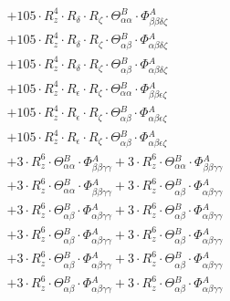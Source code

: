 \documentclass{article}
\begin{document}
\begin{subequations}
\begin{gather}
\begin{array}{c}
 \\[0.2em] 		 + 105 \cdot R_{z}^{4} \cdot R_{\delta{}} \cdot R_{\zeta{}} \cdot \Theta{}^{B}_{\alpha{}\alpha{}} \cdot \Phi{}^{A}_{\beta{}\beta{}\delta{}\zeta{}} 
 \\[0.2em] 		 + 105 \cdot R_{z}^{4} \cdot R_{\delta{}} \cdot R_{\zeta{}} \cdot \Theta{}^{B}_{\alpha{}\beta{}} \cdot \Phi{}^{A}_{\alpha{}\beta{}\delta{}\zeta{}} 
 \\[0.2em] 		 + 105 \cdot R_{z}^{4} \cdot R_{\delta{}} \cdot R_{\zeta{}} \cdot \Theta{}^{B}_{\alpha{}\beta{}} \cdot \Phi{}^{A}_{\alpha{}\beta{}\delta{}\zeta{}} 
 \\[0.2em] 		 + 105 \cdot R_{z}^{4} \cdot R_{\epsilon{}} \cdot R_{\zeta{}} \cdot \Theta{}^{B}_{\alpha{}\alpha{}} \cdot \Phi{}^{A}_{\beta{}\beta{}\epsilon{}\zeta{}} 
 \\[0.2em] 		 + 105 \cdot R_{z}^{4} \cdot R_{\epsilon{}} \cdot R_{\zeta{}} \cdot \Theta{}^{B}_{\alpha{}\beta{}} \cdot \Phi{}^{A}_{\alpha{}\beta{}\epsilon{}\zeta{}} 
 \\[0.2em] 		 + 105 \cdot R_{z}^{4} \cdot R_{\epsilon{}} \cdot R_{\zeta{}} \cdot \Theta{}^{B}_{\alpha{}\beta{}} \cdot \Phi{}^{A}_{\alpha{}\beta{}\epsilon{}\zeta{}} 
 \\[0.2em] 		 + 3 \cdot R_{z}^{6} \cdot \Theta{}^{B}_{\alpha{}\alpha{}} \cdot \Phi{}^{A}_{\beta{}\beta{}\gamma{}\gamma{}}+ 3 \cdot R_{z}^{6} \cdot \Theta{}^{B}_{\alpha{}\alpha{}} \cdot \Phi{}^{A}_{\beta{}\beta{}\gamma{}\gamma{}} 
 \\[0.2em] 		 + 3 \cdot R_{z}^{6} \cdot \Theta{}^{B}_{\alpha{}\alpha{}} \cdot \Phi{}^{A}_{\beta{}\beta{}\gamma{}\gamma{}}+ 3 \cdot R_{z}^{6} \cdot \Theta{}^{B}_{\alpha{}\beta{}} \cdot \Phi{}^{A}_{\alpha{}\beta{}\gamma{}\gamma{}} 
 \\[0.2em] 		 + 3 \cdot R_{z}^{6} \cdot \Theta{}^{B}_{\alpha{}\beta{}} \cdot \Phi{}^{A}_{\alpha{}\beta{}\gamma{}\gamma{}}+ 3 \cdot R_{z}^{6} \cdot \Theta{}^{B}_{\alpha{}\beta{}} \cdot \Phi{}^{A}_{\alpha{}\beta{}\gamma{}\gamma{}} 
 \\[0.2em] 		 + 3 \cdot R_{z}^{6} \cdot \Theta{}^{B}_{\alpha{}\beta{}} \cdot \Phi{}^{A}_{\alpha{}\beta{}\gamma{}\gamma{}}+ 3 \cdot R_{z}^{6} \cdot \Theta{}^{B}_{\alpha{}\beta{}} \cdot \Phi{}^{A}_{\alpha{}\beta{}\gamma{}\gamma{}} 
 \\[0.2em] 		 + 3 \cdot R_{z}^{6} \cdot \Theta{}^{B}_{\alpha{}\beta{}} \cdot \Phi{}^{A}_{\alpha{}\beta{}\gamma{}\gamma{}}+ 3 \cdot R_{z}^{6} \cdot \Theta{}^{B}_{\alpha{}\beta{}} \cdot \Phi{}^{A}_{\alpha{}\beta{}\gamma{}\gamma{}} 
 \\[0.2em] 		 + 3 \cdot R_{z}^{6} \cdot \Theta{}^{B}_{\alpha{}\beta{}} \cdot \Phi{}^{A}_{\alpha{}\beta{}\gamma{}\gamma{}}+ 3 \cdot R_{z}^{6} \cdot \Theta{}^{B}_{\alpha{}\beta{}} \cdot \Phi{}^{A}_{\alpha{}\beta{}\gamma{}\gamma{}} 

\end{array}
\end{gather}
\end{subequations}
\end{document}
